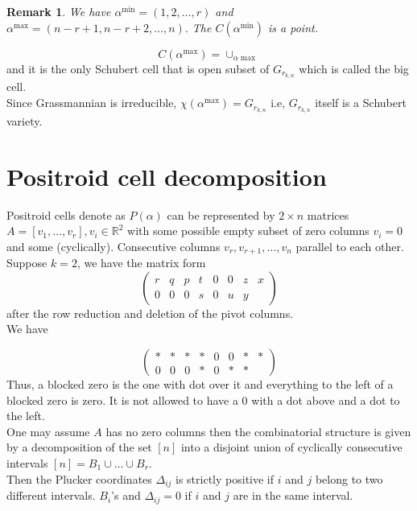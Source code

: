 \documentclass[12pt]{report}
\theoremstyle{theorem}
\newtheorem{remark}[theorem]{Remark}
\begin{document}
\begin{remark}
\normalfont We have $\alpha^{\min} = (1,2,\ldots,r)$ and $\alpha^{\max} = (n-r+1, n-r+2,\ldots, n).$ The $C(\alpha^{\min})$ is a point.
\end{remark}

$$C(\alpha^{\max}) = \cup_{\alpha\max}$$
and it is the only Schubert cell that is open subset of $G_{r_{k,n}}$ which is called the big cell.\\
Since Grassmannian is irreducible, $\chi(\alpha^{\max}) = G_{r_{k,n}}$ i.e, $G_{r_{k,n}}$ itself is a Schubert variety.

\section*{Positroid cell decomposition}
Positroid cells denote as $P(\alpha)$ can be represented by $2\times n$ matrices $A =[v_1,\ldots,v_r], v_i\in\mathbb{R}^2$ with some possible empty subset of zero columns $v_i = 0$ and some (cyclically). Consecutive columns $v_r,v_{r+1},\ldots,v_n$ parallel to each other. Suppose $k = 2$, we have the matrix form
\begin{equation}
\begin{pmatrix}
r & q & p & t & 0 & 0 & z & x\\
0 & 0 & 0 & s & 0 & u & y & 
\end{pmatrix}
 \end{equation}
after the row reduction and deletion of the pivot columns.\\
We have 

\begin{equation}
\begin{pmatrix}
* & * & * & * & 0 & 0 & * & *\\
0 & 0 & 0 & * & 0 & * & * & 
\end{pmatrix}
 \end{equation}
Thus, a blocked zero is the one with dot over it and everything to the left of a blocked zero is zero. It is not allowed to have a 0 with a dot above and a dot to the left.\\
One may assume $A$ has  no zero columns then the combinatorial structure is given by a decomposition of the set $[n]$ into a disjoint union of cyclically consecutive intervals $[n] = B_1\cup\ldots\cup B_r$.\\
Then the Pl$\ddot{\mbox{u}}$cker coordinates $\Delta_{ij}$ is strictly  positive if $i$ and $j$ belong to two different intervals. $B_i$'s and $\Delta_{ij} = 0$ if $i$ and $j$ are in the same interval.
\end{document}

